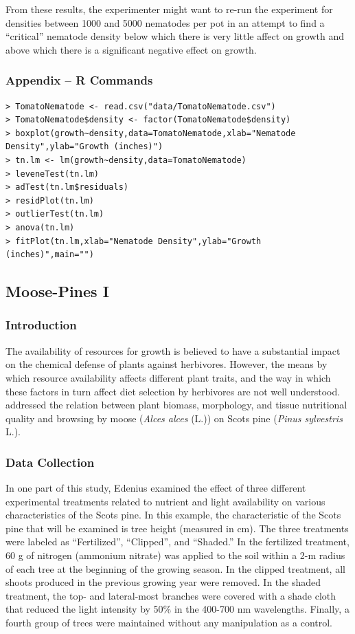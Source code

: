 \documentclass[10pt,openany]{book}\usepackage[]{graphicx}\usepackage[]{color}
\begin{document}
From these results, the experimenter might want to re-run the experiment for densities between 1000 and 5000 nematodes per pot in an attempt to find a ``critical'' nematode density below which there is very little affect on growth and above which there is a significant negative effect on growth.

\subsubsection*{Appendix -- R Commands}
\begin{Verbatim}[formatcom=\color{red},xleftmargin=5mm,commandchars=\\\{\}]
> TomatoNematode <- read.csv("data/TomatoNematode.csv")
> TomatoNematode$density <- factor(TomatoNematode$density)
> boxplot(growth~density,data=TomatoNematode,xlab="Nematode Density",ylab="Growth (inches)")
> tn.lm <- lm(growth~density,data=TomatoNematode)
> leveneTest(tn.lm)
> adTest(tn.lm$residuals)
> residPlot(tn.lm)
> outlierTest(tn.lm)
> anova(tn.lm)
> fitPlot(tn.lm,xlab="Nematode Density",ylab="Growth (inches)",main="")
\end{Verbatim}

\subsection{Moose-Pines I} \label{sect:OWAEx2A}
\subsubsection*{Introduction}


The availability of resources for growth is believed to have a substantial impact on the chemical defense of plants against herbivores.  However, the means by which resource availability affects different plant traits, and the way in which these factors in turn affect diet selection by herbivores are not well understood.  \cite{Edenius1993} addressed the relation between plant biomass, morphology, and tissue nutritional quality and browsing by moose (\emph{Alces alces} (L.)) on Scots pine (\emph{Pinus sylvestris} L.).

\subsubsection*{Data Collection}
In one part of this study, Edenius examined the effect of three different experimental treatments related to nutrient and light availability on various characteristics of the Scots pine.  In this example, the characteristic of the Scots pine that will be examined is tree height (measured in cm).  The three treatments were labeled as ``Fertilized'', ``Clipped'', and ``Shaded.''  In the fertilized treatment, 60 g of nitrogen (ammonium nitrate) was applied to the soil within a 2-m radius of each tree at the beginning of the growing season.  In the clipped treatment, all shoots produced in the previous growing year were removed.  In the shaded treatment, the top- and lateral-most branches were covered with a shade cloth that reduced the light intensity by 50\% in the 400-700 nm wavelengths.  Finally, a fourth group of trees were maintained without any manipulation as a control.
\end{document}
